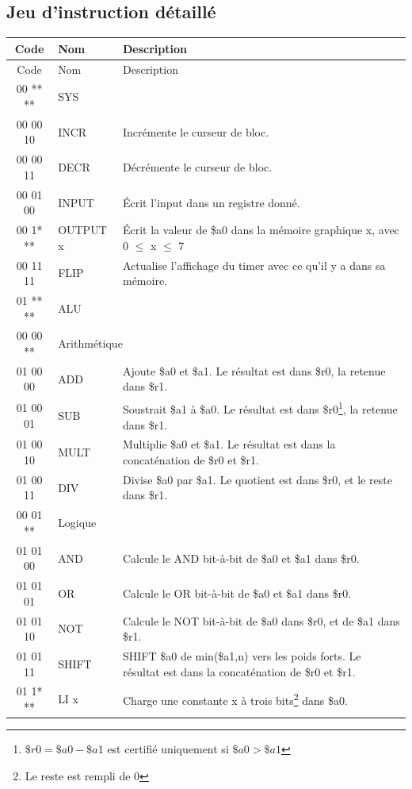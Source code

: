\documentclass{article}
\begin{document}
\subsection{Jeu d'instruction détaillé}

\begin{savenotes}
\begin{longtable}{|c|l|l|}
  
  \hline
  Code & Nom & Description \\
  \endfirsthead
  \hline
  Code & Nom & Description \\
  \hline\hline
  \endhead

  \hline\hline
  00 ** ** & \multicolumn{2}{|l|}{SYS} \\
  \hline
  00 00 10 & INCR    & Incrémente le curseur de bloc. \\
  00 00 11 & DECR    & Décrémente le curseur de bloc. \\
  \hline\hline
  00 01 00 & INPUT    & \'Ecrit l'input dans un registre donné. \\
  00 1* ** & OUTPUT x & \'Ecrit la valeur de \$a0 dans la mémoire graphique x, avec 0 $\leq$ x $\leq$ 7 \\
  00 11 11 & FLIP     & Actualise l'affichage du timer avec ce qu'il y a dans sa mémoire. \\
  
  \hline\hline
  01 ** ** & \multicolumn{2}{|l|}{ALU} \\
  \hline
  00 00 ** & \multicolumn{2}{|l|}{Arithmétique} \\
  \hline
  01 00 00 & ADD   & Ajoute \$a0 et \$a1. Le résultat est dans \$r0, la retenue dans \$r1. \\
  01 00 01 & SUB   & Soustrait \$a1 à \$a0. Le résultat est dans \$r0\footnote{$\$r0=\$a0-\$a1$ est certifié uniquement si $\$a0>\$a1$}, la retenue dans \$r1. \\
  01 00 10 & MULT  & Multiplie \$a0 et \$a1. Le résultat est dans la concaténation de \$r0 et \$r1.\\
  01 00 11 & DIV   & Divise \$a0 par \$a1. Le quotient est dans \$r0, et le reste dans \$r1. \\
  \hline
  00 01 ** & \multicolumn{2}{|l|}{Logique} \\
  \hline
  01 01 00 & AND   & Calcule le AND bit-à-bit de \$a0 et \$a1 dans \$r0. \\
  01 01 01 & OR    & Calcule le OR bit-à-bit de \$a0 et \$a1 dans \$r0. \\
  01 01 10 & NOT   & Calcule le NOT bit-à-bit de \$a0 dans \$r0, et de \$a1 dans \$r1. \\
  01 01 11 & SHIFT & SHIFT \$a0 de min(\$a1,n) vers les poids forts. Le résultat est dans la concaténation de \$r0 et \$r1.\\
  \hline
  01 1* ** & LI x  & Charge une constante x à trois bits\footnote{Le reste est rempli de 0} dans \$a0. \\
  

\end{longtable}
\end{savenotes}
\end{document}
